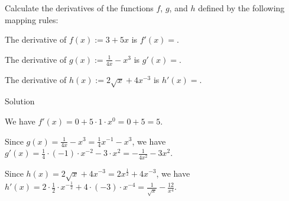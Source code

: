 \begin{MExercises}

\begin{MExercise}
Calculate the derivatives of the functions $f$, $g$, and $h$ defined by the following mapping rules:
\begin{MExerciseItems}
\item The derivative of $f(x) := 3 + 5 x$
is $f'(x) = $.
%
\item The derivative of $g(x) := \frac{1}{4 x} - x^3$
is $g'(x) = $.
%
\item The derivative of $h(x) := 2 \sqrt{x} + 4 x^{-3}$
is $h'(x) = $.
\end{MExerciseItems}
\begin{MHint}{Solution}
 \begin{MExerciseItems}
  \item We have $f'(x) = 0 + 5 \cdot 1 \cdot x^0 = 0 + 5 = 5$.
  \item Since $g(x) = \frac{1}{4x} - x^3 = \frac14 x^{-1} - x^3$, we have
  $g'(x) = \frac14 \cdot (-1) \cdot x^{-2} - 3 \cdot x^2 = - \frac{1}{4 x^2} - 3 x^2$.
  \item Since $h(x) = 2 \sqrt{x} + 4 x^{-3} = 2 x^\frac12 + 4 x^{-3}$, we have
  $h'(x) = 2 \cdot \frac12 \cdot x^{-\frac12} + 4 \cdot (-3) \cdot x^{-4} = \frac{1}{\sqrt{x}} - \frac{12}{x^4}$.
 \end{MExerciseItems}
\end{MHint}
\end{MExercise}


\end{MExercises}
